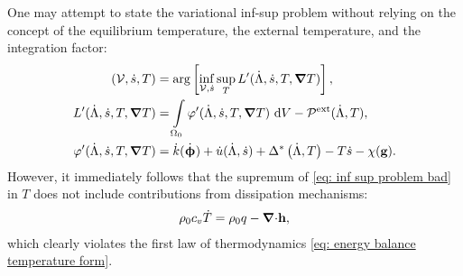 \begin{remark}
One may attempt to state the variational inf-sup problem without relying on the concept of the equilibrium temperature, the external temperature, and the integration factor:
\begin{subequations}
\begin{align}
    \left( \mathcal{V}, \dot{s}, T \right) &= \arg \left[ \inf_{\mathcal{V}, \dot{s}} \sup_T L'(\dot{\Lambda}, \dot{s}, T, \boldsymbol{\nabla} T) \right], \label{eq: inf sup problem bad} \\
    L'(\dot{\Lambda}, \dot{s}, T, \boldsymbol{\nabla} T) &= \int\limits_{\Omega_0} \varphi'(\dot{\Lambda}, \dot{s}, T, \boldsymbol{\nabla} T) \text{ d}V - \mathcal{P}^\text{ext}(\dot{\Lambda}, T), \\
    \varphi'(\dot{\Lambda}, \dot{s}, T, \boldsymbol{\nabla} T) &= \dot{k}(\dot{\boldsymbol{\upphi}}) + \dot{u}(\dot{\Lambda}, \dot{s}) + \Delta^*\left( \dot{\Lambda}, T \right) - T\dot{s} - \chi(\textbf{g}).
\end{align}
\end{subequations}
However, it immediately follows that the supremum of \eqref{eq: inf sup problem bad} in $T$ does not include contributions from dissipation mechanisms:
\begin{align}
    \rho_0 c_v \dot{T} = \rho_0 q - {\boldsymbol{\nabla} \cdot} \textbf{h},
\end{align}
which clearly violates the first law of thermodynamics \eqref{eq: energy balance temperature form}.
\end{remark}

